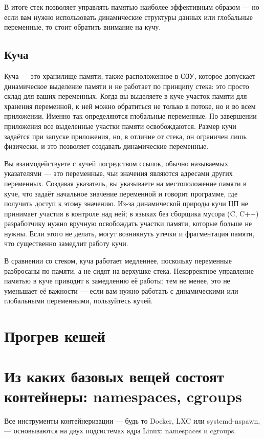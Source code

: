 В итоге стек позволяет управлять памятью наиболее эффективным образом — но если вам нужно использовать динамические структуры данных или глобальные переменные, то стоит обратить внимание на кучу.

\subsection{Куча}

Куча — это хранилище памяти, также расположенное в ОЗУ, которое допускает динамическое выделение памяти и не работает по принципу стека: это просто склад для ваших переменных. Когда вы выделяете в куче участок памяти для хранения переменной, к ней можно обратиться не только в потоке, но и во всем приложении. Именно так определяются глобальные переменные. По завершении приложения все выделенные участки памяти освобождаются. Размер кучи задаётся при запуске приложения, но, в отличие от стека, он ограничен лишь физически, и это позволяет создавать динамические переменные.

Вы взаимодействуете с кучей посредством ссылок, обычно называемых указателями — это переменные, чьи значения являются адресами других переменных. Создавая указатель, вы указываете на местоположение памяти в куче, что задаёт начальное значение переменной и говорит программе, где получить доступ к этому значению. Из-за динамической природы кучи ЦП не принимает участия в контроле над ней; в языках без сборщика мусора (C, C++) разработчику нужно вручную освобождать участки памяти, которые больше не нужны. Если этого не делать, могут возникнуть утечки и фрагментация памяти, что существенно замедлит работу кучи.

В сравнении со стеком, куча работает медленнее, поскольку переменные разбросаны по памяти, а не сидят на верхушке стека. Некорректное управление памятью в куче приводит к замедлению её работы; тем не менее, это не уменьшает её важности — если вам нужно работать с динамическими или глобальными переменными, пользуйтесь кучей.

\section{Прогрев кешей}

\section{Из каких базовых вещей состоят контейнеры: namespaces, cgroups}
	Все инструменты контейнеризации — будь то Docker, LXC или systemd-nspawn,— основываются на двух подсистемах ядра Linux: namespaces и cgroups. 
	
